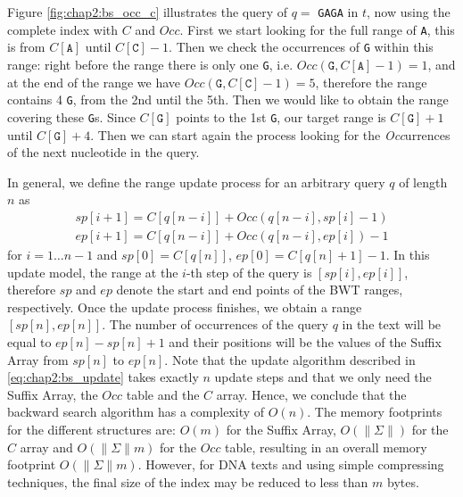 Figure \ref{fig:chap2:bs_occ_c} illustrates the query of $q =$
\texttt{GAGA} in $t$, now using the complete index with $C$ and
$Occ$. First we start looking for the full range of \texttt{A}, this
is from $C[\texttt{A}]$ until $C[\texttt{C}]-1$. Then we check the
occurrences of \texttt{G} within this range: right before the range
there is only one \texttt{G},
i.e. $Occ(\texttt{G},C[\texttt{A}]-1)=1$, and at the end of the range
we have $Occ(\texttt{G},C[\texttt{C}]-1)=5$, therefore the range
contains 4 \texttt{G}, from the 2nd until the 5th. Then we would like
to obtain the range covering these \texttt{G}s. Since $C[\texttt{G}]$
points to the 1st \texttt{G}, our target range is $C[\texttt{G}] + 1$
until $C[\texttt{G}] + 4$. Then we can start again the process looking
for the {\em Occ}urrences of the next nucleotide in the query.

In general, we define the range update process for an arbitrary query
$q$ of length $n$ as
\begin{equation}
  \label{eq:chap2:bs_update}
  \begin{array}{c}
  sp[i+1] = C[q[n-i]] + Occ(q[n-i],sp[i] - 1) \\
  ep[i+1] = C[q[n-i]] + Occ(q[n-i],ep[i]) - 1
  \end{array}
\end{equation}
for $i = 1 \ldots n-1$ and $sp[0] = C[q[n]]$, $ep[0] =
C[q[n]+1]-1$. In this update model, the range at the $i$-th step of
the query is $[sp[i], ep[i]]$, therefore $sp$ and $ep$ denote the
start and end points of the BWT ranges, respectively. Once the update
process finishes, we obtain a range $[sp[n],ep[n]]$. The number of
occurrences of the query $q$ in the text will be equal to
$ep[n]-sp[n]+1$ and their positions will be the values of the Suffix
Array from $sp[n]$ to $ep[n]$. Note that the update algorithm
described in \eqref{eq:chap2:bs_update} takes exactly $n$ update steps
and that we only need the Suffix Array, the $Occ$ table and the $C$
array. Hence, we conclude that the backward search algorithm has a
complexity of $O(n)$. The memory footprints for the different
structures are: $O(m)$ for the Suffix Array, $O(\|\Sigma\|)$ for the
$C$ array and $O(\|\Sigma\|m)$ for the $Occ$ table, resulting in an
overall memory footprint $O(\|\Sigma\|m)$. However, for DNA texts and
using simple compressing techniques, the final size of the index may
be reduced to less than $m$ bytes.

